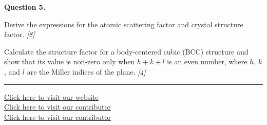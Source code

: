 \documentclass[11pt,a4paper]{article}
\newcommand{\pts}[1]{\hfill   \textit{[#1]}}
\begin{document}
\noindent   \textbf{Question 5.}

\begin{parts}
  \item Derive the expressions for the atomic scattering factor and crystal structure factor. \pts{8}
  \item Calculate the structure factor for a body-centered cubic (BCC) structure and show that its value is non-zero only when $h+k+l$ is an even number, where $h$, $k$, and $l$ are the Miller indices of the plane. \pts{4}
\end{parts}

\vfill
\rule{\linewidth}{0.4pt}

\begin{center}\small
  \href{https://bhu-exam.vercel.app/}{Click here to visit our website}\\[4pt]
  \href{https://me-aryan.vercel.app/}{Click here to visit our contributor}\\[4pt]
  \href{https://quashan-me.vercel.app/}{Click here to visit our contributor}
\end{center}
\end{document}
